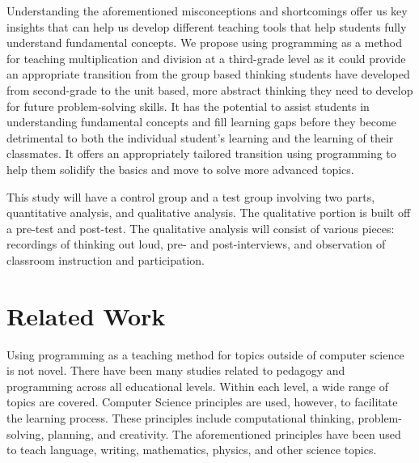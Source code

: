 \documentclass[12pt]{extarticle}
\begin{document}
Understanding the aforementioned misconceptions and shortcomings offer us key insights that can help us develop different teaching tools that help students fully understand fundamental concepts.
We propose using programming as a method for teaching multiplication and division at a third-grade level as it could provide an appropriate transition from the group based thinking students have developed from second-grade to the unit based, more abstract thinking they need to develop for future problem-solving skills.
It has the potential to assist students in understanding fundamental concepts and fill learning gaps before they become detrimental to both the individual student’s learning and the learning of their classmates.
It offers an appropriately tailored transition using programming to help them solidify the basics and move to solve more advanced topics.

This study will have a control group and a test group involving two parts, quantitative analysis, and qualitative analysis.
The qualitative portion is built off a pre-test and post-test.
The qualitative analysis will consist of various pieces: recordings of thinking out loud, pre- and post-interviews, and observation of classroom instruction and participation.


\section*{Related Work}

Using programming as a teaching method for topics outside of computer science is not novel.
There have been many studies related to pedagogy and programming across all educational levels.
Within each level, a wide range of topics are covered.
Computer Science principles are used, however, to facilitate the learning process.
These principles include computational thinking, problem-solving, planning, and creativity.
The aforementioned principles have been used to teach language, writing, mathematics, physics, and other science topics.
\end{document}

